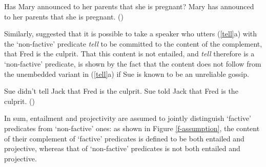 \documentclass[11pt,fleqn]{article}
\newcommand{\6}{\mbox{$[\hspace*{-.6mm}[$}}
\newcommand{\9}{\mbox{$]\hspace*{-.6mm}]$}}
\begin{document}
\begin{exe}
\ex\label{announce2} 
\begin{xlist}
\ex Has Mary announced to her parents that she is pregnant? 
\ex Mary has announced to her parents that she is pregnant. \hfill (\citealt[139]{schlenker10})
\end{xlist}
\end{exe}
Similarly, \citet{spector-egre2015} suggested that it is possible to take a speaker who utters (\ref{tell}a) with the `non-factive' predicate {\em tell}  to be committed to the content of the complement, that Fred is the culprit. That this content is not entailed, and {\em tell} therefore is a `non-factive' predicate, is shown by the fact that the content does not follow from the unembedded variant in (\ref{tell}a) if Sue is known to be an unreliable gossip.

\begin{exe}
\ex\label{tell}
\begin{xlist}
\ex Sue didn't tell Jack that Fred is the culprit. 
\ex Sue told Jack that Fred is the culprit. \hfill (\citealt[1739]{spector-egre2015})
\end{xlist}
\end{exe}

In sum, entailment and projectivity are assumed to jointly distinguish `factive' predicates from `non-factive' ones: as shown in Figure \ref{f-assumption}, the content of their complement of `factive' predicates is defined to be both entailed and projective, whereas that of `non-factive' predicates is not both entailed and projective. 
\end{document}
